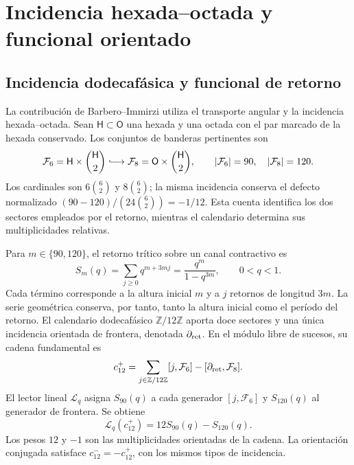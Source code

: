 \section{Incidencia hexada–octada y funcional orientado}
\subsection{Incidencia dodecafásica y funcional de retorno}

La contribución de Barbero--Immirzi utiliza el transporte angular y la
incidencia hexada--octada. Sean $\mathsf H\subset\mathsf O$ una hexada
y una octada con el par marcado de la hexada conservado. Los conjuntos de
banderas pertinentes son
\begin{equation}
 \mathcal F_6=\mathsf H\times\binom{\mathsf H}{2}
 \lhook\joinrel\longrightarrow
 \mathcal F_8=\mathsf O\times\binom{\mathsf H}{2},
 \qquad |\mathcal F_6|=90,\quad |\mathcal F_8|=120.
 \label{iii:eq:barbero-flags}
\end{equation}
Los cardinales son $6\binom62$ y $8\binom62$; la misma incidencia
conserva el defecto normalizado
$(90-120)/(24\binom62)=-1/12$. Esta cuenta identifica los dos sectores
empleados por el retorno, mientras el calendario determina sus
multiplicidades relativas.

Para $m\in\{90,120\}$, el retorno trítico sobre un canal contractivo es
\begin{equation}
 S_m(q)=\sum_{j\geq0}q^{m+3mj}
       =\frac{q^m}{1-q^{3m}},\qquad 0<q<1.
 \label{iii:eq:barbero-return-series}
\end{equation}
Cada término corresponde a la altura inicial $m$ y a $j$ retornos de
longitud $3m$. La serie geométrica conserva, por tanto, tanto la altura
inicial como el período del retorno. El calendario dodecafásico
$\mathbb Z/12\mathbb Z$ aporta doce sectores y una única incidencia
orientada de frontera, denotada $\partial_{\rm ret}$. En el módulo
libre de sucesos, su cadena fundamental es
\begin{equation}
 c_{12}^{+}
 =\sum_{j\in\mathbb Z/12\mathbb Z}[j,\mathcal F_6]
  -[\partial_{\rm ret},\mathcal F_8].
 \label{iii:eq:barbero-cycle}
\end{equation}
El lector lineal $\mathscr L_q$ asigna $S_{90}(q)$ a cada generador
$[j,\mathcal F_6]$ y $S_{120}(q)$ al generador de frontera. Se obtiene
\begin{equation}
 \mathscr L_q(c_{12}^{+})=12S_{90}(q)-S_{120}(q).
 \label{iii:eq:barbero-weights}
\end{equation}
Los pesos $12$ y $-1$ son las multiplicidades orientadas de la cadena.
La orientación conjugada satisface $c_{12}^{-}=-c_{12}^{+}$, con los
mismos tipos de incidencia.

